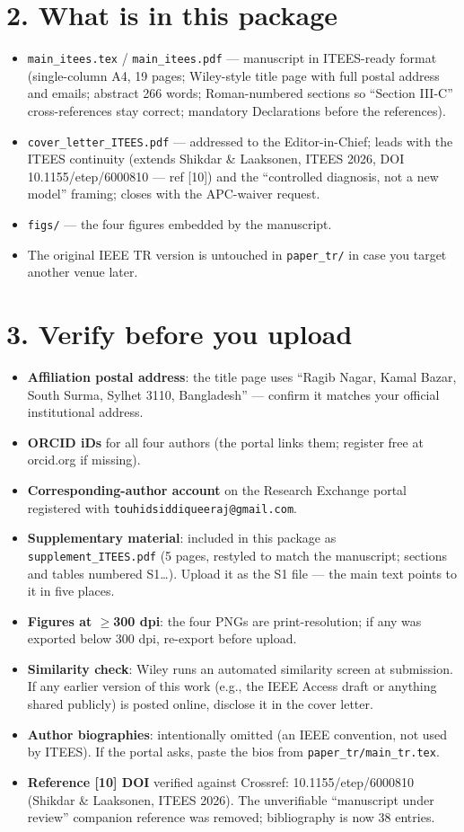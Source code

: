 \documentclass[11pt,a4paper]{article}
\newcommand{\boxitem}{\item[$\square$]}
\begin{document}
\section*{2. What is in this package}
\begin{itemize}
\item \texttt{main\_itees.tex} / \texttt{main\_itees.pdf} --- manuscript in ITEES-ready format (single-column A4, 19 pages; Wiley-style title page with full postal address and emails; abstract 266 words; Roman-numbered sections so ``Section III-C'' cross-references stay correct; mandatory Declarations before the references).
\item \texttt{cover\_letter\_ITEES.pdf} --- addressed to the Editor-in-Chief; leads with the ITEES continuity (extends Shikdar \& Laaksonen, ITEES 2026, DOI 10.1155/etep/6000810 --- ref [10]) and the ``controlled diagnosis, not a new model'' framing; closes with the APC-waiver request.
\item \texttt{figs/} --- the four figures embedded by the manuscript.
\item The original IEEE TR version is untouched in \texttt{paper\_tr/} in case you target another venue later.
\end{itemize}

\section*{3. Verify before you upload}
\begin{itemize}
\boxitem \textbf{Affiliation postal address}: the title page uses ``Ragib Nagar, Kamal Bazar, South Surma, Sylhet 3110, Bangladesh'' --- confirm it matches your official institutional address.
\boxitem \textbf{ORCID iDs} for all four authors (the portal links them; register free at orcid.org if missing).
\boxitem \textbf{Corresponding-author account} on the Research Exchange portal registered with \texttt{touhidsiddiqueeraj@gmail.com}.
\boxitem \textbf{Supplementary material}: included in this package as \texttt{supplement\_ITEES.pdf} (5 pages, restyled to match the manuscript; sections and tables numbered S1\ldots). Upload it as the S1 file --- the main text points to it in five places.
\boxitem \textbf{Figures at $\ge$300 dpi}: the four PNGs are print-resolution; if any was exported below 300 dpi, re-export before upload.
\boxitem \textbf{Similarity check}: Wiley runs an automated similarity screen at submission. If any earlier version of this work (e.g., the IEEE Access draft or anything shared publicly) is posted online, disclose it in the cover letter.
\boxitem \textbf{Author biographies}: intentionally omitted (an IEEE convention, not used by ITEES). If the portal asks, paste the bios from \texttt{paper\_tr/main\_tr.tex}.
\boxitem \textbf{Reference [10] DOI} verified against Crossref: 10.1155/etep/6000810 (Shikdar \& Laaksonen, ITEES 2026). The unverifiable ``manuscript under review'' companion reference was removed; bibliography is now 38 entries.
\end{itemize}
\end{document}

